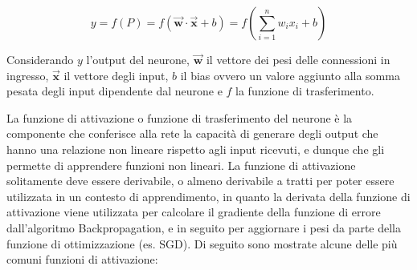 \begin{equation}
    \label{eq:neuron}
    y = f(P) = f(\vec{\mathbf{w}} \cdot \vec{\mathbf{x}} + b) = f(\sum_{i=1}^{n} w_i x_i + b)
\end{equation}

Considerando $y$ l'output del neurone, $\vec{\mathbf{w}}$ il vettore dei pesi delle connessioni in ingresso, 
$\vec{\mathbf{x}}$ il vettore degli input, $b$ il bias ovvero un valore aggiunto alla somma pesata degli input 
dipendente dal neurone e $f$ la funzione di trasferimento.

La funzione di attivazione o funzione di trasferimento del neurone è la componente che conferisce alla rete la capacità di generare degli output
che hanno una relazione non lineare rispetto agli input ricevuti, e dunque che gli permette di apprendere funzioni non lineari.
La funzione di attivazione solitamente deve essere derivabile, o almeno derivabile a tratti per poter essere utilizzata in un contesto di apprendimento,
in quanto la derivata della funzione di attivazione viene utilizzata per calcolare il gradiente della funzione di errore dall'algoritmo Backpropagation,
e in seguito per aggiornare i pesi da parte della funzione di ottimizzazione (es. SGD).
Di seguito sono mostrate alcune delle più comuni funzioni di attivazione:

